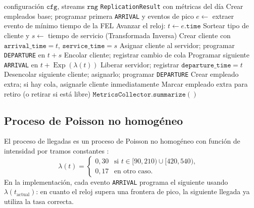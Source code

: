 \begin{algorithm}[H]
\caption{Bucle principal de la simulación DES}
\label{alg:des}
\begin{algorithmic}[1]
\Require configuración $\mathtt{cfg}$, streams $\mathtt{rng}$
\Ensure \texttt{ReplicationResult} con métricas del día
\State Crear empleados base; programar primera \texttt{ARRIVAL} y eventos de pico
  \State $e \gets$ extraer evento de mínimo tiempo de la FEL
  \State Avanzar el reloj: $t \gets e.\mathtt{time}$
    \State Sortear tipo de cliente y $s \gets$ tiempo de servicio (Transformada Inversa)
    \State Crear cliente con $\mathtt{arrival\_time} = t$, $\mathtt{service\_time} = s$
      \State Asignar cliente al servidor; programar \texttt{DEPARTURE} en $t + s$
    \Else
      \State Encolar cliente; registrar cambio de cola
    \EndIf
    \State Programar siguiente \texttt{ARRIVAL} en $t + \operatorname{Exp}(\lambda(t))$
    \State Liberar servidor; registrar $\mathtt{departure\_time} = t$
      \State Desencolar siguiente cliente; asignarlo; programar \texttt{DEPARTURE}
    \EndIf
    \State Crear empleado extra; si hay cola, asignarle cliente inmediatamente
    \State Marcar empleado extra para retiro (o retirar si está libre)
  \EndIf
\EndWhile
\State \Return $\mathtt{MetricsCollector.summarize}()$
\end{algorithmic}
\end{algorithm}

\subsection{Proceso de Poisson no homogéneo}

El proceso de llegadas es un proceso de Poisson no homogéneo con función de
intensidad por tramos constantes \citep{curso_conf2}:
\[
  \lambda(t) = \begin{cases}
    0{,}30 & \text{si } t \in [90,210) \cup [420,540), \\
    0{,}17 & \text{en otro caso.}
  \end{cases}
\]
En la implementación, cada evento \texttt{ARRIVAL} programa el siguiente
usando $\lambda(t_{\text{actual}})$: en cuanto el reloj supera una frontera
de pico, la siguiente llegada ya utiliza la tasa correcta.

